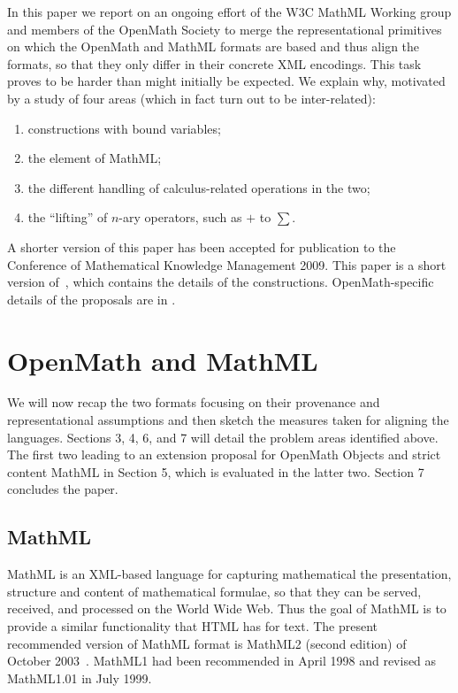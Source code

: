 \documentclass{llncs}
\begin{document}
In this paper we report on an ongoing effort of the W3C MathML Working group and members
of the OpenMath Society to merge the representational primitives on which the OpenMath and
MathML formats are based and thus align the formats, so that they only differ in their
concrete XML encodings. This task proves to be harder than might initially be expected.
We explain why, motivated by a study of four areas (which in fact turn out to be
inter-related):
\begin{enumerate}
\item constructions with bound variables;
\item the {} element of MathML;
\item the different handling of calculus-related operations in the two;
\item the ``lifting'' of $n$-ary operators, such as $+$ to $\sum$.
\end{enumerate}

\iffull A shorter version of this paper has been accepted for publication to the
Conference of Mathematical Knowledge Management 2009.
\else This paper is a short version of~\cite{DavenportKohlhase2009b}, which contains the details
of the constructions.\fi{} OpenMath-specific details of the proposals are in
\cite{DavenportKohlhase2009c,DavenportKohlhase2009d}.

\section{OpenMath and MathML}\label{sec:formatsnhistory}
We will now recap the two formats focusing on their provenance and representational
assumptions and then sketch the measures taken for aligning the languages. Sections 3, 4,
6, and 7 will detail the problem areas identified above. The first two leading to an
extension proposal for OpenMath Objects and strict content MathML in Section 5, which is
evaluated in the latter two. Section 7 concludes the paper.


\subsection{MathML}\label{sec:mathML}

MathML is an XML-based language for capturing mathematical the presentation, structure and
content of mathematical formulae, so that they can be served, received, and processed on
the World Wide Web. Thus the goal of MathML is to provide a similar functionality that
HTML has for text. The present recommended version of MathML format is MathML2 (second
edition) of October 2003~\cite{WorldWideWebConsortium2003b}. MathML1 had been recommended
in April 1998 and revised as MathML1.01 in July 1999.
\end{document}
